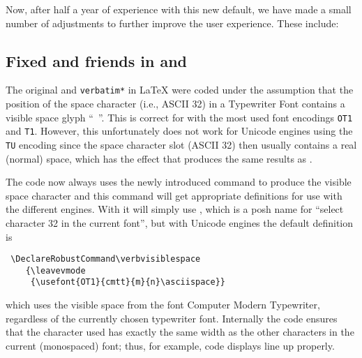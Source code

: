 \documentclass{ltnews}
\providecommand\XeTeX{\hologo{XeTeX}}
\providecommand\LuaTeX{\hologo{LuaTeX}}
\providecommand\pdfTeX{\hologo{pdfTeX}}
\newcommand\githubissue[2][]{\ifhmode\unskip\fi
     \quad\penalty500\strut\nobreak\hfill
     \mbox{\small\itshape(github issue#1 #2)}\par}
\newcommand\sxissue[1]{\ifhmode\unskip\fi
     \quad\penalty500\strut\nobreak\hfill
     \mbox{\small\itshape\url(#1)}\par}
\begin{document}
Now, after half a year of experience with
this new default,
we have
made a small number of adjustments to further improve the user experience.
These include:



\subsection{Fixed  and friends in \XeTeX{} and \LuaTeX{}}


The original  and \texttt{verbatim*} in \LaTeX{} were coded
under the assumption that the position of the space character (i.e.,
ASCII 32) in a Typewriter Font contains a visible space glyph
``\verb*= =''. This is correct for \pdfTeX{} with the most used font
encodings \texttt{OT1} and \texttt{T1}.  However, this unfortunately
does not work for Unicode engines using the \texttt{TU} encoding since
the space character slot (ASCII 32) then usually contains a real
(normal) space, which has the effect that  produces the same
results as .

The  code now always uses the newly introduced command
 to produce the visible space character and this
command will get appropriate definitions for use with the different
engines.  With \pdfTeX{} it will simply use , which is
a posh name for ``select character 32 in the current font'', but with
Unicode engines the default definition is
\begin{verbatim}
 \DeclareRobustCommand\verbvisiblespace
    {\leavevmode
     {\usefont{OT1}{cmtt}{m}{n}\asciispace}}
\end{verbatim}
which uses the visible space from the font Computer Modern Typewriter,
regardless of the currently chosen typewriter font.  Internally the
code ensures that the character used has exactly the same width as the
other characters in the current (monospaced) font; thus, for example,
code displays line up properly.
\end{document}
